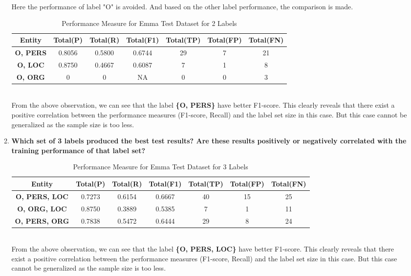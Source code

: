 \documentclass[12pt]{article}
\begin{document}
\begin{enumerate}
\begin{enumerate}[label={\alph*.}]
Here the performance of label "O" is avoided. And based on the other label performance, the comparison is made.
\begin{table}[ht!]
\centering
\begin{tabular}{ |c|c|c|c|c|c|c|} 
\hline 
\textbf{Entity} & \textbf{Total(P)} & \textbf{Total(R)} & \textbf{Total(F1)} &\textbf{Total(TP)} &\textbf{Total(FP)} & \textbf{Total(FN)} \\ [2ex]
\hline 
\textbf{O, PERS} & 0.8056 & 0.5800 & 0.6744 & 29 & 7  & 21\\ [1ex]
\hline
\textbf{O, LOC} & 0.8750 & 0.4667 & 0.6087 & 7 & 1  & 8\\ [1ex]
\hline
\textbf{O, ORG} & 0 & 0  & NA & 0 & 0 & 3 \\ [1ex]
\hline
\end{tabular}
\caption{Performance Measure for Emma Test Dataset for 2 Labels}
\label{table:9}
\end{table}
\\From the above observation, we can see that the label \textbf{\{O, PERS\}} have better F1-score. This clearly reveals that there exist a positive correlation between the performance measures (F1-score, Recall) and the label set size  in this case. But this case cannot be generalized as the sample size is too less.\\

\item \textbf{ Which set of 3 labels produced the best test results? Are these results positively or negatively correlated with the training performance of that label set?}\\
\begin{table}[ht!]
\centering
\begin{tabular}{ |c|c|c|c|c|c|c|} 
\hline 
\textbf{Entity} & \textbf{Total(P)} & \textbf{Total(R)} & \textbf{Total(F1)} &\textbf{Total(TP)} &\textbf{Total(FP)} & \textbf{Total(FN)} \\ [2ex]
\hline 
\textbf{O, PERS, LOC} & 0.7273 & 0.6154 & 0.6667 & 40 & 15  & 25\\ [1ex]
\hline
\textbf{O, ORG, LOC} & 0.8750 & 0.3889 & 0.5385 & 7 & 1  & 11\\ [1ex]
\hline
\textbf{O, PERS, ORG} & 0.7838 & 0.5472  & 0.6444 & 29 & 8 & 24 \\ [1ex]
\hline
\end{tabular}
\caption{Performance Measure for Emma Test Dataset for 3 Labels}
\label{table:10}
\end{table}
\\From the above observation, we can see that the label \textbf{\{O, PERS, LOC\}} have better F1-score. This clearly reveals that there exist a positive correlation between the performance measures (F1-score, Recall) and the label set size  in this case. But this case cannot be generalized as the sample size is too less.\\


\end{enumerate}
\end{enumerate}
\end{document}
